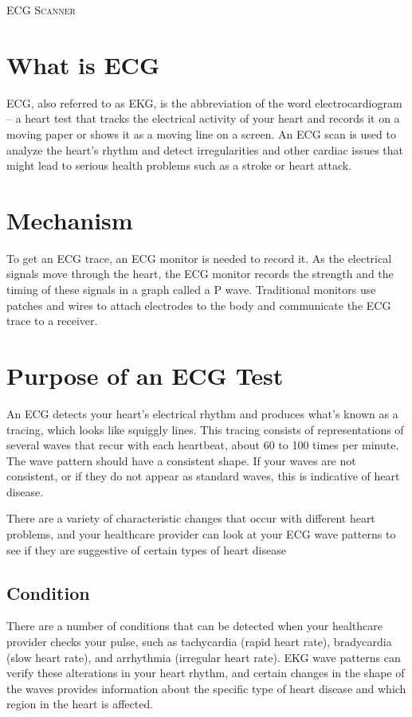 \documentclass[11pt]{article}
\begin{document}
\clearpage
\newpage
\textsc{\LARGE ECG Scanner}\\[1.5cm]
\section*{What is ECG}
ECG, also referred to as EKG, is the abbreviation of the word electrocardiogram – a heart test that tracks the electrical activity of your heart and records it on a moving paper or shows it as a moving line on a screen. An ECG scan is used to analyze the heart’s rhythm and detect irregularities and other cardiac issues that might lead to serious health problems such as a stroke or heart attack.

\section*{Mechanism}
To get an ECG trace, an ECG monitor is needed to record it. As the electrical signals move through the heart, the ECG monitor records the strength and the timing of these signals in a graph called a P wave. Traditional monitors use patches and wires to attach electrodes to the body and communicate the ECG trace to a receiver.

\section*{Purpose of an ECG Test}
An ECG detects your heart's electrical rhythm and produces what's known as a tracing, which looks like squiggly lines. This tracing consists of representations of several waves that recur with each heartbeat, about 60 to 100 times per minute. The wave pattern should have a consistent shape. If your waves are not consistent, or if they do not appear as standard waves, this is indicative of heart disease.

There are a variety of characteristic changes that occur with different heart problems, and your healthcare provider can look at your ECG wave patterns to see if they are suggestive of certain types of heart disease
\subsection*{Condition}
There are a number of conditions that can be detected when your healthcare provider checks your pulse, such as tachycardia (rapid heart rate), bradycardia (slow heart rate), and arrhythmia (irregular heart rate). EKG wave patterns can verify these alterations in your heart rhythm, and certain changes in the shape of the waves provides information about the specific type of heart disease and which region in the heart is affected.
\end{document}
